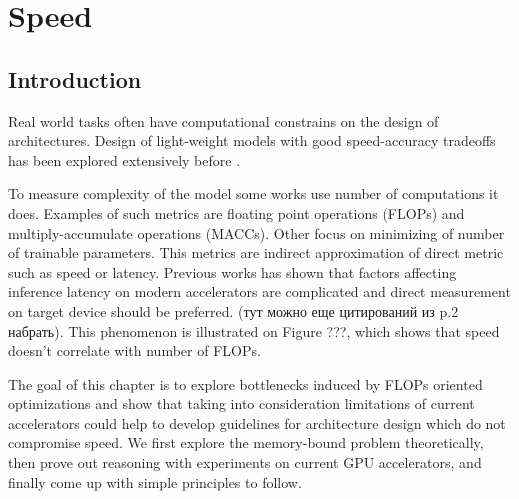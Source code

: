 \chapter{Speed} 
\label{sec:speed}



\section{Introduction}



Real world tasks often have computational constrains on the design of architectures. Design of light-weight models with good speed-accuracy tradeoffs has been explored extensively before \cite{howard2017_mobilenetv1} \cite{sandler2018_mobilenetv2} \cite{ma2018_shufflenetv2} \cite{zhang2018_shufflenet}.  %

To measure complexity of the model some works use number of computations it does. Examples of such metrics are floating point operations (FLOPs) and multiply-accumulate operations (MACCs). Other focus on minimizing of number of trainable parameters. This metrics are indirect approximation of direct metric such as speed or latency. Previous works has shown \cite{radosavovic2020_designing} \cite{lee2020_compounding_improvements} that factors affecting inference latency on modern accelerators are complicated and direct measurement on target device should be preferred. (тут можно еще цитирований из \cite{ma2018_shufflenetv2} p.2 набрать). This phenomenon is illustrated on Figure {???}, which shows that speed doesn't correlate with number of FLOPs.   

The goal of this chapter is to explore bottlenecks induced by FLOPs oriented optimizations and show that taking into consideration limitations of current accelerators could help to develop guidelines for architecture design which do not compromise speed. We first explore the memory-bound problem theoretically, then prove out reasoning with experiments on current GPU accelerators, and finally come up with simple principles to follow. 

